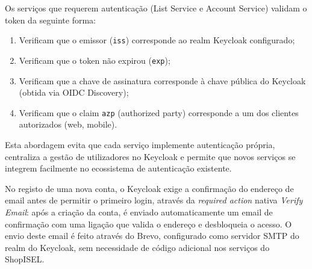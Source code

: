 Os serviços que requerem autenticação (List Service e Account Service) validam o token da seguinte forma:
\begin{enumerate}
    \item Verificam que o emissor (\texttt{iss}) corresponde ao realm Keycloak configurado;
    \item Verificam que o token não expirou (\texttt{exp});
    \item Verificam que a chave de assinatura corresponde à chave pública do Keycloak (obtida via OIDC Discovery);
    \item Verificam que o claim \texttt{azp} (authorized party) corresponde a um dos clientes autorizados (web, mobile).
\end{enumerate}

Esta abordagem evita que cada serviço implemente autenticação própria, centraliza a gestão de utilizadores no Keycloak e permite que novos serviços se integrem facilmente no ecossistema de autenticação existente.

No registo de uma nova conta, o Keycloak exige a confirmação do endereço de email antes de permitir o primeiro login, através da \textit{required action} nativa \textit{Verify Email}: após a criação da conta, é enviado automaticamente um email de confirmação com uma ligação que valida o endereço e desbloqueia o acesso. O envio deste email é feito através do Brevo, configurado como servidor \ac{SMTP} do realm do Keycloak, sem necessidade de código adicional nos serviços do ShopISEL.

